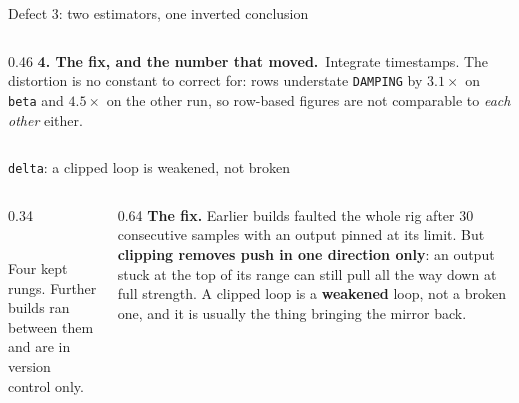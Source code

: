 \documentclass[aspectratio=169]{beamer}
\newcommand{\thefixn}{\textbf{4. The fix, and the number that moved.}}
\begin{document}
\begin{frame}{Defect 3: two estimators, one inverted conclusion}
\begin{columns}[T]
\begin{column}{0.46\textwidth}
      \vspace{1.5mm}
      \thefixn\ Integrate timestamps. The distortion is no constant to correct
      for: rows understate \texttt{DAMPING} by $3.1\times$ on \texttt{beta} and
      $4.5\times$ on the other run, so row-based figures are not comparable to
      \emph{each other} either.
    \end{column}
  \end{columns}
\end{frame}

\begin{frame}{\texttt{delta}: a clipped loop is weakened, not broken}
  \begin{columns}[T]
    \begin{column}{0.34\textwidth}
      \centering
      \\[1mm]
      {\scriptsize Four kept rungs. Further builds ran between them and are in
      version control only.}
    \end{column}
    \begin{column}{0.64\textwidth}
      \footnotesize
      \textbf{The fix.} Earlier builds faulted the whole rig after 30
      consecutive samples with an output pinned at its limit. But
      \textbf{clipping removes push in one direction only}: an output stuck at
      the top of its range can still pull all the way down at full strength. A
      clipped loop is a \textbf{weakened} loop, not a broken one, and it is
      usually the thing bringing the mirror back.


\end{column}
\end{columns}
\end{frame}
\end{document}
